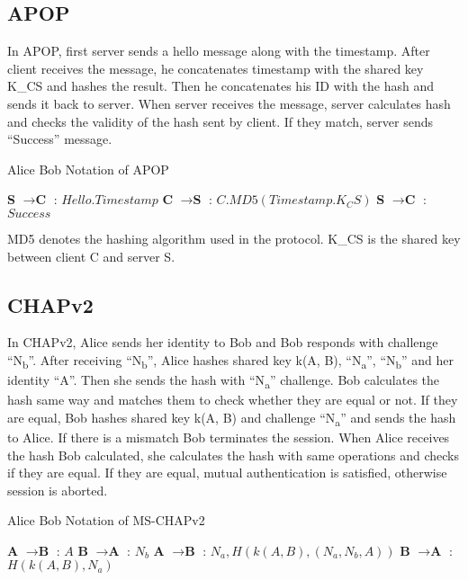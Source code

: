 \documentclass[a4paper, 12pt, titlepage]{article}
\begin{document}
\subsection{APOP}
In APOP, first server sends a hello message along with the timestamp. After client receives the message, he concatenates timestamp with the shared key K\_CS and hashes the result. Then he concatenates his ID with the hash and sends it back to server. When server receives the message, server calculates hash and checks the validity of the hash sent by client. If they match, server sends “Success” message.
\begin{algorithm}[H]
    \caption{Alice Bob Notation of APOP \cite{avapop}}
    \label{algo:apop}
    \begin{algorithmic}[1]
        \State \textbf{S} $ \rightarrow \textbf{C} $ : $Hello.Timestamp$
        \State \textbf{C} $ \rightarrow \textbf{S} $ : $C.MD5(Timestamp.K_CS)$
        \State \textbf{S} $ \rightarrow \textbf{C} $ : $Success$
    \end{algorithmic}
\end{algorithm}
MD5 denotes the hashing algorithm used in the protocol. K\_CS is the shared key between client C and server S.
\subsection{CHAPv2}
In CHAPv2, Alice sends her identity to Bob and Bob responds with challenge “N\textsubscript{b}”. After receiving “N\textsubscript{b}”, Alice hashes shared key k(A, B), “N\textsubscript{a}”, “N\textsubscript{b}” and her identity “A”. Then she sends the hash with “N\textsubscript{a}” challenge. Bob calculates the hash same way and matches them to check whether they are equal or not. If they are equal, Bob hashes shared key k(A, B) and challenge “N\textsubscript{a}” and sends the hash to Alice. If there is a mismatch Bob terminates the session. When Alice receives the hash Bob calculated, she calculates the hash with same operations and checks if they are equal. If they are equal, mutual authentication is satisfied, otherwise session is aborted.
\begin{algorithm}[H]
    \caption{Alice Bob Notation of MS-CHAPv2 \cite{avchap}}
    \label{algo:chap}
    \begin{algorithmic}[1]
        \State \textbf{A} $ \rightarrow \textbf{B} $ : $A$
        \State \textbf{B} $ \rightarrow \textbf{A} $ : $N_b$
        \State \textbf{A} $ \rightarrow \textbf{B} $ : $N_a,H(k(A,B),(N_a,N_b,A))$
        \State \textbf{B} $ \rightarrow \textbf{A} $ : $H(k(A,B),N_a)$
    \end{algorithmic}
\end{algorithm}
\end{document}

